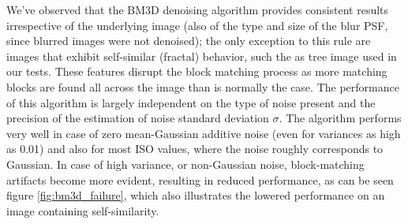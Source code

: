 \documentclass[12pt,notitlepage]{report}
\begin{document}
We've observed that the BM3D denoising algorithm provides consistent results irrespective of the underlying image (also of the type and size of the blur PSF, since blurred images were not denoised); the only exception to this rule are images that exhibit self-similar (fractal) behavior, such the as tree image used in our tests. These features disrupt the block matching process as more matching blocks are found all across the image than is normally the case. The performance of this algorithm is largely independent on the type of noise present and the precision of the estimation of noise standard deviation $\sigma$. The algorithm performs very well in case of zero mean-Gaussian additive noise (even for variances as high as 0.01) and also for most ISO values, where the noise roughly corresponds to Gaussian. In case of high variance, or non-Gaussian noise, block-matching artifacts become more evident, resulting in reduced performance, as can be seen figure \ref{fig:bm3d_failure}, which also illustrates the lowered performance on an image containing self-similarity. 
\end{document}
